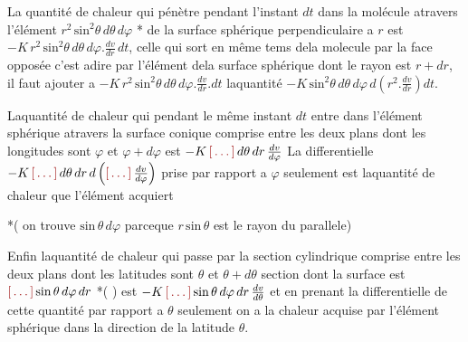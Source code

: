 \documentclass[11pt,a4paper]{article}
\begin{document}
La quantité de chaleur qui pénètre pendant l'instant $dt$ dans la molécule atravers
l'élément $r^{2}\,\text{sin}^{2}\theta\,d\theta\,d\varphi$ * de la surface sphérique perpendiculaire a $r$
est $-K\,r^{2}\,\text{sin}^{2}\theta\,d\theta\,d\varphi.\frac{dv}{dr}\,dt$,  celle qui sort en même tems dela molecule
par la face opposée c'est adire par l'élément dela surface sphérique dont le rayon
est $r + dr$, il faut ajouter a $-K\,r^{2}\,\text{sin}^{2}\theta\,d\theta\,d\varphi.\frac{dv}{dr}.dt$ laquantité
$-K\,\text{sin}^{2}\theta\,d\theta\,d\varphi\,d\left(r^{2}.\frac{dv}{dr}\right)dt$.

Laquantité de chaleur qui pendant le même instant $dt$ entre dans  l'élément
sphérique atravers la surface conique comprise entre les deux plans
dont les longitudes sont $\varphi$ et $\varphi + d\varphi$ est $-K\,\ill{}\,d\theta\,dr\,\frac{dv}{d\varphi}$
La differentielle $-K\,\ill{}\,d\theta\,dr\,d\left(\ill{}\,\frac{dv}{d\varphi}\right)$ prise par rapport a $\varphi$
seulement est laquantité de chaleur que  l'élément acquiert

*( on trouve $\text{sin}\,\theta\,d\varphi$ parceque $r\,\text{sin}\,\theta$ est le rayon du parallele)

Enfin laquantité de chaleur qui passe par la section cylindrique
comprise entre les deux plans dont les latitudes sont $\theta$ et $\theta + d\theta$
section dont la surface est  $\ill{}\,\text{sin}\,\theta\,d\varphi\,dr$ *( )
est $-K\,\ill{}\,\text{sin}\,\theta\,d\varphi\,dr\,\frac{dv}{d\theta}$ et en prenant la differentielle de cette
quantité par rapport a $\theta$ seulement on a la chaleur acquise
par l'élément sphérique dans la direction de la latitude $\theta$.
\end{document}

